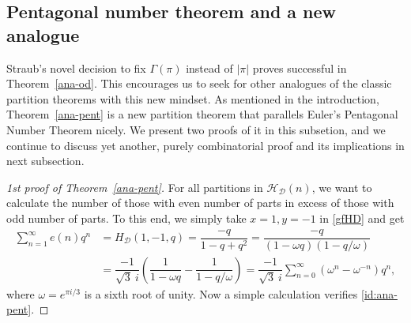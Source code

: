 \documentclass[12pt]{amsart}
\numberwithin{equation}{section}
\theoremstyle{plain}
\theoremstyle{definition}
\def\D{\mathcal{D}}
\def\H{\mathcal{H}}
\begin{document}
\subsection{Pentagonal number theorem and a new analogue}
Straub's novel decision to fix $\Gamma(\pi)$ instead of $|\pi|$ proves successful in Theorem~\ref{ana-od}. This encourages us to seek for other analogues of the classic partition theorems with this new mindset. As mentioned in the introduction, Theorem~\ref{ana-pent} is a new partition theorem that parallels Euler's Pentagonal Number Theorem nicely. We present two proofs of it in this subsetion, and we continue to discuss yet another, purely combinatorial proof and its implications in next subsection.

\begin{proof}[1st proof of Theorem~\ref{ana-pent}]
For all partitions in $\H_{\D}(n)$, we want to calculate the number of those with even number of parts in excess of those with odd number of parts. To this end, we simply take $x=1,y=-1$ in \eqref{gfHD} and get
\begin{align*}
\sum\limits_{n=1}^{\infty} e(n)q^n &=H_{\D}(1,-1,q) = \dfrac{-q}{1-q+q^2}= \dfrac{-q}{(1-\omega q)(1-q/\omega)}\\
&=\dfrac{-1}{\sqrt{3}\:i}(\dfrac{1}{1-\omega q}-\dfrac{1}{1-q/\omega})= \dfrac{-1}{\sqrt{3}\:i}\sum\limits_{n=0}^{\infty}(\omega^n-\omega^{-n})q^n,
\end{align*}
where $\omega=e^{\pi i/3}$ is a sixth root of unity. Now a simple calculation verifies \eqref{id:ana-pent}.
\end{proof}
\end{document}
